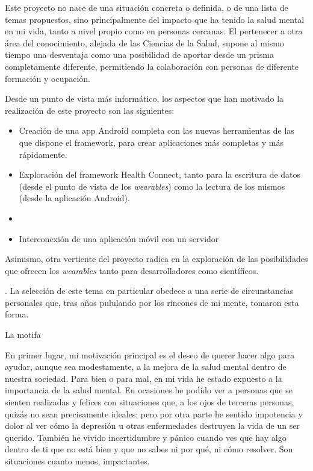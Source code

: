 Este proyecto no nace de una situación concreta o definida, o de una lista de temas propuestos, sino principalmente del impacto que ha tenido la salud mental en mi vida, tanto a nivel propio como en personas cercanas. El pertenecer a otra área del conocimiento, alejada de las Ciencias de la Salud, supone al mismo tiempo una desventaja como una posibilidad de aportar desde un prisma completamente diferente, permitiendo la colaboración con personas de diferente formación y ocupación.

Desde un punto de vista más informático, los aspectos que han motivado la realización de este proyecto son las siguientes:
\begin{itemize}
    \item Creación de una app Android completa con las nuevas herramientas de las que dispone el \gls{framework}, para crear aplicaciones más completas y más rápidamente.
    \item Exploración del \gls{framework} Health Connect, tanto para la escritura de datos (desde el punto de vista de los \textit{\glspl{wearable}}) como la lectura de los mismos (desde la aplicación Android).
    \item 
    \item Interconexión de una aplicación móvil con un servidor
\end{itemize}

Asimismo, otra vertiente del proyecto radica en la exploración de las posibilidades que ofrecen los \textit{\glspl{wearable}} tanto para desarrolladores como científicos.


. La selección de este tema en particular obedece a una serie de circunstancias personales que, tras años pululando por los rincones de mi mente, tomaron esta forma.

La motifa

En primer lugar, mi motivación principal es el deseo de querer hacer algo para ayudar, aunque sea modestamente, a la mejora de la salud mental dentro de nuestra sociedad. Para bien o para mal, en mi vida he estado expuesto a la importancia de la salud mental. En ocasiones he podido ver a personas que se sienten realizadas y felices con situaciones que, a los ojos de terceras personas, quizás no sean precisamente ideales; pero por otra parte he sentido impotencia y dolor al ver cómo la depresión u otras enfermedades destruyen la vida de un ser querido. También he vivido incertidumbre y pánico cuando ves que hay algo dentro de ti que no está bien y que no sabes ni por qué, ni cómo resolver. Son situaciones cuanto menos, impactantes.

